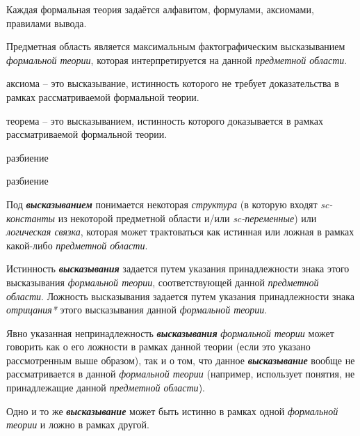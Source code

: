 Каждая формальная теория задаётся алфавитом, формулами, аксиомами, правилами вывода.


Предметная область является максимальным фактографическим высказыванием \textit{формальной теории}, которая интерпретируется на данной \textit{предметной области}.

аксиома -- это высказывание, истинность которого не требует доказательства в рамках рассматриваемой формальной теории.

теорема -- это высказыванием, истинность которого доказывается в рамках рассматриваемой формальной теории.

\begin{SCn}
\begin{scnrelfromset}{разбиение}
\end{scnrelfromset}
\begin{scnrelfromset}{разбиение}
\end{scnrelfromset}
\end{SCn}

Под \textbf{\textit{высказыванием}} понимается некоторая \textit{структура} (в которую входят \textit{sc-константы} из некоторой предметной области и/или \textit{sc-переменные}) или \textit{логическая связка}, которая может трактоваться как истинная или ложная в рамках какой-либо \textit{предметной области}.

Истинность \textbf{\textit{высказывания}} задается путем указания принадлежности знака этого высказывания \textit{формальной теории}, соответствующей данной \textit{предметной области}. Ложность высказывания задается путем указания принадлежности знака \textit{отрицания*} этого высказывания данной \textit{формальной теории}.

Явно указанная непринадлежность \textbf{\textit{высказывания}} \textit{формальной теории} может говорить как о его ложности в рамках данной теории (если это указано рассмотренным выше образом), так и о том, что данное  \textbf{\textit{высказывание}} вообще не рассматривается в данной \textit{формальной теории} (например, использует понятия, не принадлежащие данной \textit{предметной области}).

Одно и то же \textbf{\textit{высказывание}} может быть истинно в рамках одной \textit{формальной теории} и ложно в рамках другой.

